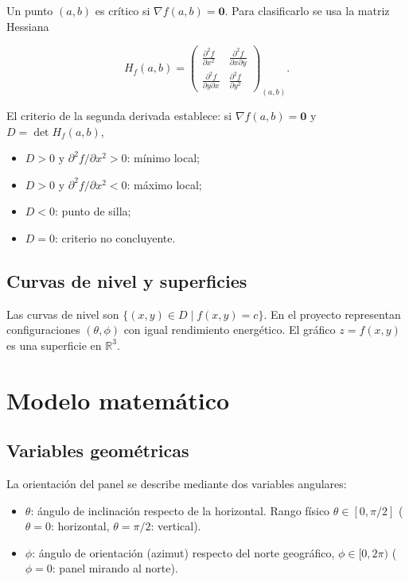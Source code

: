 \documentclass[12pt,a4paper]{article}
\begin{document}
Un punto $(a,b)$ es crítico si $\nabla f(a,b)=\mathbf{0}$. Para clasificarlo se usa la matriz Hessiana

\[
H_f(a,b) =
\begin{pmatrix}
\frac{\partial^2 f}{\partial x^2} & \frac{\partial^2 f}{\partial x\partial y} \\[6pt]
\frac{\partial^2 f}{\partial y\partial x} & \frac{\partial^2 f}{\partial y^2}
\end{pmatrix}_{(a,b)}.
\]

El criterio de la segunda derivada establece: si $\nabla f(a,b)=\mathbf{0}$ y $D = \det H_f(a,b)$,
\begin{itemize}
    \item $D>0$ y $\partial^2 f/\partial x^2 > 0$: mínimo local;
    \item $D>0$ y $\partial^2 f/\partial x^2 < 0$: máximo local;
    \item $D<0$: punto de silla;
    \item $D=0$: criterio no concluyente.
\end{itemize}

\subsection{Curvas de nivel y superficies}

Las curvas de nivel son $\{(x,y)\in D \mid f(x,y)=c\}$. En el proyecto representan configuraciones $(\theta,\phi)$ con igual rendimiento energético. El gráfico $z=f(x,y)$ es una superficie en $\mathbb{R}^3$.

\section{Modelo matemático}

\subsection{Variables geométricas}

La orientación del panel se describe mediante dos variables angulares:
\begin{itemize}
    \item $\theta$: ángulo de inclinación respecto de la horizontal. Rango físico $\theta\in[0,\pi/2]$ ($\theta=0$: horizontal, $\theta=\pi/2$: vertical).
    \item $\phi$: ángulo de orientación (azimut) respecto del norte geográfico, $\phi\in[0,2\pi)$ ($\phi=0$: panel mirando al norte).
\end{itemize}
\end{document}
